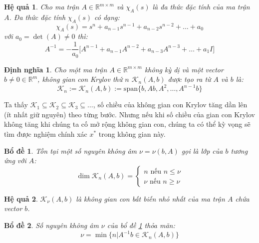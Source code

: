 \documentclass[14pt, a4paper]{article}
\numberwithin{equation}{section}
\numberwithin{algorithm}{section}
\numberwithin{figure}{section}
\newtheorem{bd}{Bổ đề}
\newtheorem{dn}{Định nghĩa}
\newtheorem{hq}{Hệ quả}
\numberwithin{dl}{section}
\numberwithin{md}{section}
\numberwithin{bd}{section}
\numberwithin{dn}{section}
\numberwithin{hq}{section}
\begin{document}
\begin{hq}
    Cho ma trận $A \in \mathbb{R}^{m \times m}$ và $\chi_A(s)$ là đa thức đặc tính của ma trận $A$. Đa thức đặc tính $\chi_A(s)$ có dạng:
    \begin{equation}
        \chi_A(s) = s^n + a_{n-1}s^{n-1} + a_{n-2}s^{n-2} + \dots + a_0
    \end{equation}
    với $a_0 = \det(A) \neq 0$ thì:
    \begin{equation}
        A^{-1} = - \dfrac{1}{a_0} \lbrack A^{n-1} + a_{n-1}A^{n-2} + a_{n-3}A^{n-3} + \dots + a_1 I \rbrack
    \end{equation}
\end{hq}

\begin{dn}
    Cho một ma trận $A \in \mathbb{R}^{m \times m}$ không kỳ dị và một vector $b \neq 0 \in \mathbb{R}^m$, không gian con Krylov thứ $n$ $\mathcal{K}_n(A, b)$ được tạo ra từ $A$ và $b$ là:
    \begin{equation}
        \mathcal{K}_n := \mathcal{K}_n (A,b) := \mathrm{span} \lbrace b, Ab, A^2, \dots, A^{n-1}b \rbrace
    \end{equation}
\end{dn}

Ta thấy $\mathcal{K}_1 \subseteq \mathcal{K}_2 \subseteq \mathcal{K}_3 \subseteq \dots$, số chiều của không gian con Krylov tăng dần lên (ít nhất giữ nguyên) theo từng bước. Nhưng nếu khi số chiều của gian con Krylov không tăng khi chúng ta cố mở rộng không gian con, chúng ta có thể kỳ vọng sẽ tìm được nghiệm chính xác $x^*$ trong không gian này.

\begin{bd} \label{bd:invariant-space}
    Tồn tại một số nguyên không âm $\nu = \nu(b, A)$ gọi là lớp của $b$ tương ứng với $A$:
    \begin{equation}
        \dim \mathcal{K}_n(A, b) = \begin{cases} n \text{ nếu } n \leq \nu \\ \nu \text{ nếu } n \geq \nu \end{cases}
    \end{equation}
\end{bd}

\begin{hq}
    $\mathcal{K}_{\nu}(A, b)$ là không gian con bất biến nhỏ nhất của ma trận $A$ chứa vector $b$.
\end{hq}

\begin{bd}
    Số nguyên không âm $\nu$ của bổ đề \ref{bd:invariant-space} thỏa mãn:
    \begin{equation}
        \nu = \min \lbrace n \vert A^{-1}b \in \mathcal{K}_n(A, b) \rbrace 
    \end{equation}
\end{bd}
\end{document}
